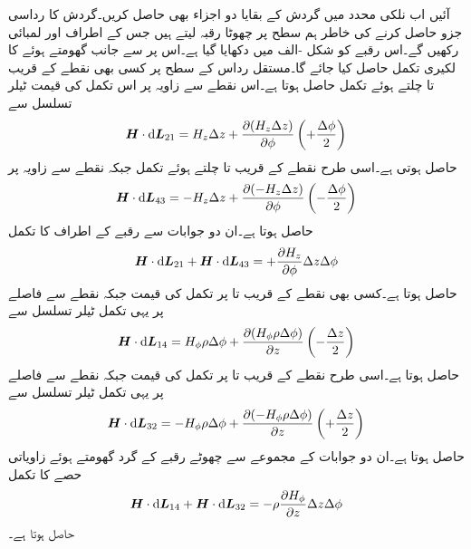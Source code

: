 آئیں اب نلکی محدد میں گردش کے بقایا دو اجزاء بھی حاصل کریں۔گردش کا رداسی جزو حاصل کرنے کی خاطر ہم  سطح پر چھوٹا رقبہ لیتے ہیں جس کے اطراف  اور  لمبائی رکھیں گے۔اس رقبے کو شکل -الف میں دکھایا گیا ہے۔اس پر  سے  جانب گھومتے ہوئے  کا لکیری تکمل حاصل کیا جائے گا۔مستقل رداس کے سطح پر کسی بھی نقطے کے قریب  تا  چلتے ہوئے تکمل  حاصل ہوتا ہے۔اس نقطے سے   زاویہ پر اس تکمل کی قیمت ٹیلر تسلسل سے
\begin{align*}
\kvec{H} \cdot \dif \kvec{L}_{21}=H_z \Delta z+\frac{\partial (H_z \Delta z)}{\partial \phi}\left(+\frac{\Delta \phi}{2}\right)
\end{align*}
حاصل ہوتی ہے۔اسی طرح نقطے  کے قریب  تا  چلتے ہوئے تکمل  جبکہ نقطے سے  زاویہ پر
\begin{align*}
\kvec{H} \cdot \dif \kvec{L}_{43}=-H_z \Delta z+\frac{\partial (-H_z \Delta z)}{\partial \phi}\left(-\frac{\Delta \phi}{2}\right)
\end{align*}
حاصل ہوتا ہے۔ان دو جوابات سے رقبے کے  اطراف کا تکمل
\begin{align}\label{مساوات_مقناطیسی_نلکی_رداسی_گردش_تکمل_الف}
\kvec{H} \cdot \dif \kvec{L}_{21}+\kvec{H} \cdot \dif \kvec{L}_{43}=+\frac{\partial H_z}{\partial \phi} \Delta z \Delta \phi
\end{align}
حاصل ہوتا ہے۔کسی بھی نقطے کے قریب  تا  پر تکمل کی قیمت  جبکہ نقطے سے  فاصلے پر یہی تکمل ٹیلر تسلسل سے
\begin{align*}
\kvec{H} \cdot \dif \kvec{L}_{14}=H_{\phi} \rho \Delta \phi+\frac{\partial (H_{\phi} \rho \Delta \phi)}{\partial z}\left(-\frac{\Delta z}{2}\right)
\end{align*}
حاصل ہوتا ہے۔اسی طرح نقطے کے قریب  تا  پر تکمل کی
 قیمت  جبکہ نقطے سے  فاصلے پر یہی تکمل ٹیلر تسلسل سے
\begin{align*}
\kvec{H} \cdot \dif \kvec{L}_{32}=-H_{\phi} \rho \Delta \phi+\frac{\partial (-H_{\phi} \rho \Delta \phi)}{\partial z}\left(+\frac{\Delta z}{2}\right)
\end{align*}
حاصل ہوتا ہے۔ان دو جوابات کے مجموعے سے چھوٹے رقبے کے گرد گھومتے ہوئے زاویاتی حصے کا تکمل
\begin{align}\label{مساوات_مقناطیسی_نلکی_رداسی_گردش_تکمل_ب}
 \kvec{H} \cdot \dif \kvec{L}_{14}+\kvec{H} \cdot \dif \kvec{L}_{32}=-\rho\frac{\partial H_{\phi} }{\partial z}\Delta z\Delta \phi
\end{align}
حاصل ہوتا ہے۔

